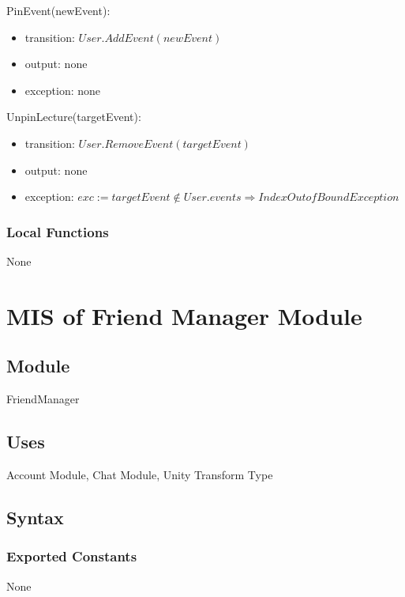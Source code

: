 \documentclass[12pt, titlepage]{article}
\begin{document}
\noindent PinEvent(newEvent):
\begin{itemize}
\item transition: $User.AddEvent(newEvent)$ 
\item output: none
\item exception: none
\end{itemize}

\noindent UnpinLecture(targetEvent):
\begin{itemize}
\item transition: $User.RemoveEvent(targetEvent)$ 
\item output: none
\item exception: $exc := targetEvent \notin User.events \Rightarrow IndexOutofBound Exception$
\end{itemize}

\subsubsection{Local Functions}

None

\newpage

\section{MIS of Friend Manager Module} \label{mFM}

\subsection{Module}

FriendManager

\subsection{Uses}

Account Module, Chat Module, Unity Transform Type

\subsection{Syntax}

\subsubsection{Exported Constants}
None
\end{document}
